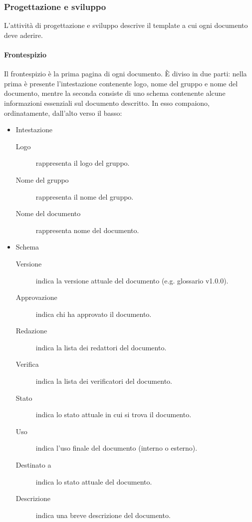 \documentclass[../../norme-di-progetto.tex]{subfiles}
\begin{document}
\subsubsection{Progettazione e sviluppo}%
\label{subs:progettazione_e_sviluppo}

L'attività di progettazione e sviluppo descrive il template a cui ogni documento deve aderire.

\paragraph{Frontespizio}%
\label{par:frontespizio}
Il frontespizio è la prima pagina di ogni documento. È diviso in due parti: nella prima è presente l'intestazione contenente logo, nome del gruppo e nome del documento, mentre la seconda consiste di uno schema contenente alcune informazioni essenziali sul documento descritto. In esso compaiono, ordinatamente, dall'alto verso il basso:

\begin{itemize}
  \item Intestazione
        \begin{description}
          \item [Logo] rappresenta il logo del gruppo.
          \item [Nome del gruppo] rappresenta il nome del gruppo.
          \item [Nome del documento] rappresenta nome del documento.
        \end{description}
  \item Schema
        \begin{description}
          \item [Versione] indica la versione attuale del documento (e.g\@. glossario v1.0.0).
          \item [Approvazione] indica chi ha approvato il documento.
          \item [Redazione] indica la lista dei redattori del documento.
          \item [Verifica] indica la lista dei verificatori del documento.
          \item [Stato] indica lo stato attuale in cui si trova il documento.
          \item [Uso] indica l'uso finale del documento (interno o esterno).
          \item [Destinato a] indica lo stato attuale del documento.
          \item [Descrizione] indica una breve descrizione del documento.
        \end{description}
\end{itemize}
\end{document}
